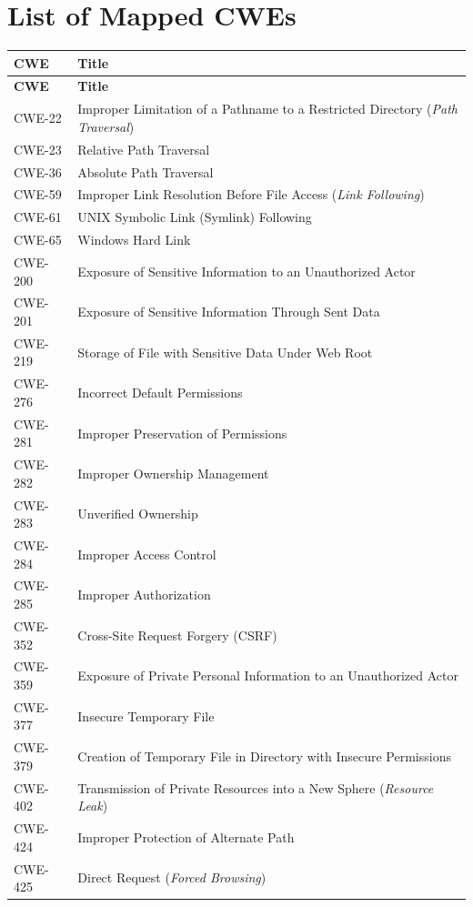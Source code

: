 \documentclass[11pt]{article}
\begin{document}
\newpage
\section{List of Mapped CWEs}
\renewcommand{\arraystretch}{1.1}
\begin{longtable}{@{}p{2.2cm}p{12.2cm}@{}}
\toprule
\textbf{CWE} & \textbf{Title} \\
\midrule
\endfirsthead
\toprule
\textbf{CWE} & \textbf{Title} \\
\midrule
\endhead
\bottomrule
\endfoot

CWE-22 & Improper Limitation of a Pathname to a Restricted Directory (\textit{Path Traversal}) \\
CWE-23 & Relative Path Traversal \\
CWE-36 & Absolute Path Traversal \\
CWE-59 & Improper Link Resolution Before File Access (\textit{Link Following}) \\
CWE-61 & UNIX Symbolic Link (Symlink) Following \\
CWE-65 & Windows Hard Link \\
CWE-200 & Exposure of Sensitive Information to an Unauthorized Actor \\
CWE-201 & Exposure of Sensitive Information Through Sent Data \\
CWE-219 & Storage of File with Sensitive Data Under Web Root \\
CWE-276 & Incorrect Default Permissions \\
CWE-281 & Improper Preservation of Permissions \\
CWE-282 & Improper Ownership Management \\
CWE-283 & Unverified Ownership \\
CWE-284 & Improper Access Control \\
CWE-285 & Improper Authorization \\
CWE-352 & Cross-Site Request Forgery (CSRF) \\
CWE-359 & Exposure of Private Personal Information to an Unauthorized Actor \\
CWE-377 & Insecure Temporary File \\
CWE-379 & Creation of Temporary File in Directory with Insecure Permissions \\
CWE-402 & Transmission of Private Resources into a New Sphere (\textit{Resource Leak}) \\
CWE-424 & Improper Protection of Alternate Path \\
CWE-425 & Direct Request (\textit{Forced Browsing}) \\

\end{longtable}
\end{document}
